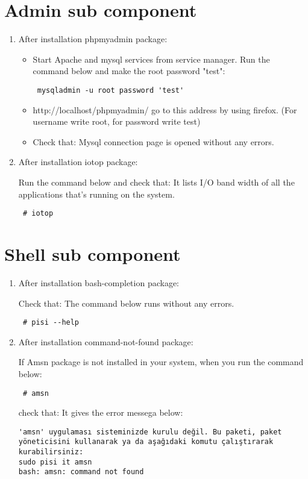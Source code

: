\documentclass[a4paper,10pt]{article}
\begin{document}
\section{Admin sub component}
\begin{enumerate}
 \item After installation  phpmyadmin package:
\begin{itemize}
 \item Start Apache and mysql services from service manager. Run the command below and make the root password "test":
\begin{verbatim}
 mysqladmin -u root password 'test'
\end{verbatim}

 \item http://localhost/phpmyadmin/ go to this address by using firefox. (For username write root, for password  write test)
 \item Check that: Mysql connection page is opened without any errors.
\end{itemize}



 \item After installation  iotop package:

Run the command below and check that: It lists I/O band width of all the applications that's running on the system.
\begin{verbatim}
 # iotop
\end{verbatim}

\end{enumerate}
\section{Shell sub component}
\begin{enumerate}
 \item After installation  bash-completion package:

Check that: The command below runs without any errors.
\begin{verbatim}
 # pisi --help
\end{verbatim}

\item After installation  command-not-found package:

If Amsn package is not installed in your system, when you run the command below:
\begin{verbatim}
 # amsn
\end{verbatim}

check that: It gives the error messega below:
\begin{verbatim}
'amsn' uygulaması sisteminizde kurulu değil. Bu paketi, paket yöneticisini kullanarak ya da aşağıdaki komutu çalıştırarak kurabilirsiniz:
sudo pisi it amsn
bash: amsn: command not found
\end{verbatim}

\end{enumerate}
\end{document}
